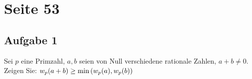 \section{Seite 53}

\subsection{Aufgabe 1}
Sei $p$ eine Primzahl, $a,b$ seien von Null verschiedene rationale Zahlen,
$a + b \neq 0$. Zeigen Sie: $w_p(a + b) \geq \min{(w_p(a), w_p(b))}$
